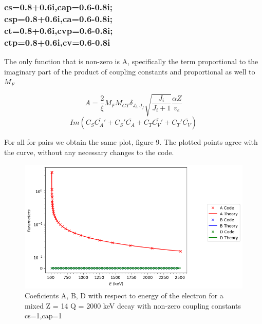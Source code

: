 \documentclass[twocolumn]{article}
\begin{document}
\subsubsection*{cs=0.8+0.6i,cap=0.6-0.8i;\\csp=0.8+0.6i,ca=0.6-0.8i;\\ct=0.8+0.6i,cvp=0.6-0.8i;\\ctp=0.8+0.6i,cv=0.6-0.8i}

The only function that is non-zero is A, specifically the term proportional to the imaginary part of the product of coupling constants and proportional as well to $M_F$


 $$A = \frac{2}{\xi}M_FM_{GT}\delta_{J_i,J_f}\sqrt{\frac{J_i}{J_i+1}}\frac{\alpha Z }{v_e}$$$$Im(C_S\overline{C_A'}+C_S'\overline{C_A}+C_T\overline{C_V'}+C_T'\overline{C_V})$$

For all for pairs we obtain the same plot, figure 9. The plotted points agree with the curve, without any necessary changes to the code.

\begin{figure}
	\centering
	\includegraphics[width=\columnwidth]{plots/cscap_comp_mixed_result.png}
	\caption{Coeficients A, B, D with respect to energy of the electron for a mixed Z = 14 Q = 2000 keV decay with non-zero coupling constants cs=1,cap=1}
\end{figure}
\end{document}
